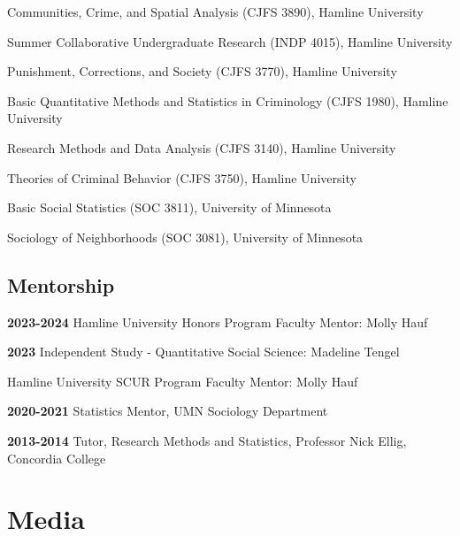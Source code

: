\documentclass[letterpaper]{article}
\newenvironment{publist}{%
  \begin{list}{}{%
    \setlength{\leftmargin}{0cm}   %
    \setlength{\labelwidth}{2cm}     %
    \setlength{\labelsep}{0.5cm}     %
  }%
}{%
  \end{list}%
}
\begin{document}
\begin{publist} 

\item Communities, Crime, and Spatial Analysis (CJFS 3890), Hamline University
\item Summer Collaborative Undergraduate Research (INDP 4015), Hamline University
\item Punishment, Corrections, and Society (CJFS 3770), Hamline University
\item Basic Quantitative Methods and Statistics in Criminology (CJFS 1980), Hamline University
\item Research Methods and Data Analysis (CJFS 3140), Hamline University
\item Theories of Criminal Behavior (CJFS 3750), Hamline University
\item Basic Social Statistics (SOC 3811), University of Minnesota
\item Sociology of Neighborhoods (SOC 3081), University of Minnesota

\end{publist}


\subsection*{Mentorship}

\begin{publist}

\item[\textbf{2023-2024}] Hamline University Honors Program Faculty Mentor: Molly Hauf
\item[\textbf{2023}] Independent Study - Quantitative Social Science: Madeline Tengel 
\item Hamline University SCUR Program Faculty Mentor: Molly Hauf
\item[\textbf{2020-2021}] Statistics Mentor, UMN Sociology Department
\item[\textbf{2013-2014}] Tutor, Research Methods and Statistics, Professor Nick Ellig, Concordia College

\end{publist}

\section*{\textbf{Media}}
\end{document}
